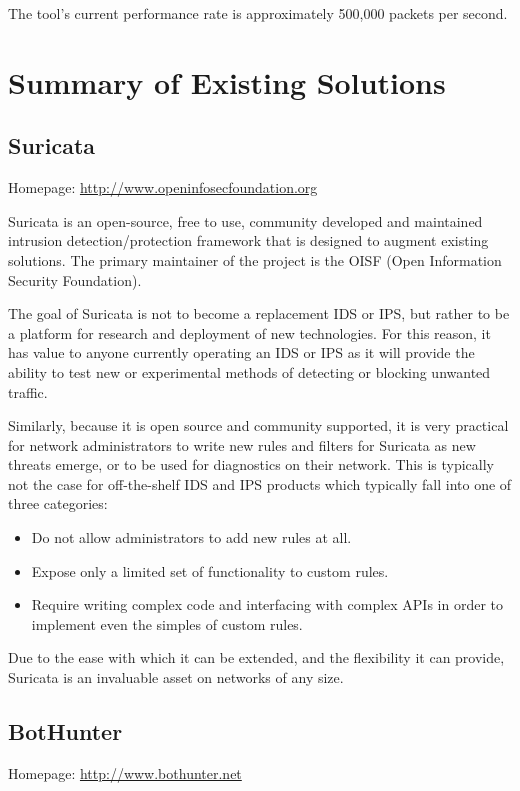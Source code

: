 \documentclass{article}
\theoremstyle{remark}
\theoremstyle{definition}
\theoremstyle{definition}
\theoremstyle{definition}
\begin{document}
The tool's current performance rate is approximately 500,000 packets per second.

\section{Summary of Existing Solutions}

\subsection{Suricata}
Homepage: \url{http://www.openinfosecfoundation.org}

Suricata is an open-source, free to use, community developed and maintained intrusion detection/protection framework that is designed to augment existing solutions. The primary maintainer of the project is the OISF (Open Information Security Foundation).

The goal of Suricata is not to become a replacement IDS or IPS, but rather to be a platform for research and deployment of new technologies. For this reason, it has value to anyone currently operating an IDS or IPS as it will provide the ability to test new or experimental methods of detecting or blocking unwanted traffic.

Similarly, because it is open source and community supported, it is very practical for network administrators to write new rules and filters for Suricata as new threats emerge, or to be used for diagnostics on their network. This is typically not the case for off-the-shelf IDS and IPS products which typically fall into one of three categories:

\begin{itemize}
\item Do not allow administrators to add new rules at all.
\item Expose only a limited set of functionality to custom rules.
\item Require writing complex code and interfacing with complex APIs in order to implement even the simples of custom rules.
\end{itemize}

Due to the ease with which it can be extended, and the flexibility it can provide, Suricata is an invaluable asset on networks of any size.

\subsection{BotHunter}
Homepage: \url{http://www.bothunter.net}
\end{document}
